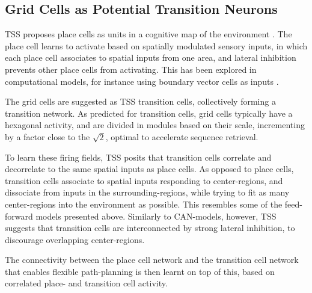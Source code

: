 \documentclass{article}
\begin{document}
    \subsection{Grid Cells as Potential Transition Neurons} \label{Grid cell as Transition cell}
    TSS proposes place cells as units in a cognitive map of the environment \parencite{Waniek2018}. The place cell learns to activate based on spatially modulated sensory inputs, in which each place cell associates to spatial inputs from one area, and lateral inhibition prevents other place cells from activating. This has been explored in computational models, for instance using boundary vector cells as inputs \parencite{Barry2006}. 
   
    The grid cells are suggested as TSS transition cells, collectively forming a transition network. As predicted for transition cells, grid cells typically have a hexagonal activity, and are divided in modules based on their scale, incrementing by a factor close to the \(\sqrt{2}\), optimal to accelerate sequence retrieval.

    To learn these firing fields, TSS posits that transition cells correlate and decorrelate to the same spatial inputs as place cells. As opposed to place cells, transition cells associate to spatial inputs responding to center-regions, and dissociate from inputs in the surrounding-regions, while trying to fit as many center-regions into the environment as possible. This resembles some of the feed-forward models presented above. Similarly to CAN-models, however, TSS suggests that transition cells are interconnected by strong lateral inhibition, to discourage overlapping center-regions.
    
    The connectivity between the place cell network and the transition cell network that enables flexible path-planning is then learnt on top of this, based on correlated place- and transition cell activity.
\end{document}
